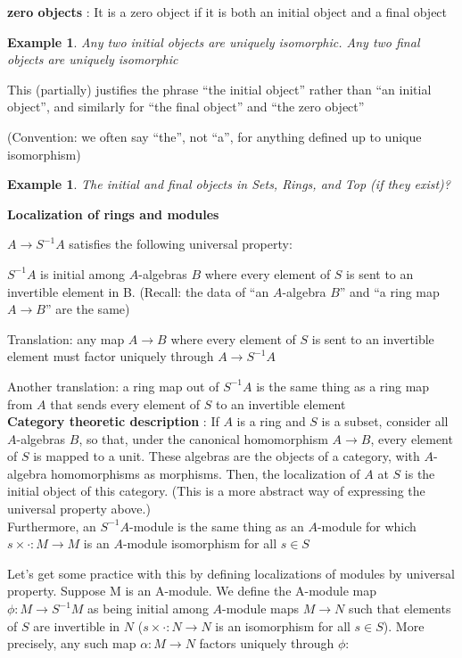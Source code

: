 \documentclass{article}
\newtheorem{example}[theorem]{Example}
\begin{document}
\textbf{zero objects} : It is a zero object if it is both an initial object and a final object
\begin{example}
    Any two initial objects are uniquely isomorphic. Any two final objects are uniquely isomorphic
\end{example}
This (partially) justifies the phrase “the initial object”
rather than “an initial object”, and similarly for “the final object” and “the zero
object”

(Convention: we often say “the”, not “a”, for anything defined up to unique isomorphism)
\begin{example}
     The initial and final objects in Sets, Rings, and Top (if they exist)?
\end{example}
\textbf{Localization of rings and modules}

$A \rightarrow S^{-1}A$ satisfies the following universal property:

$S^{-1}A$ is initial among $A$-algebras $B$ where every element of $S$ is sent to an invertible element in B. (Recall: the data of “an $A$-algebra $B$” and “a ring map $A \rightarrow B$” are the same)

Translation: any map $A \rightarrow B$ where every element of $S$ is sent to an
invertible element must factor uniquely through $A \rightarrow S^{-1}A$

Another translation:
a ring map out of $S^{-1}A$ is the same thing as a ring map from $A$ that sends every
element of $S$ to an invertible element\\

\textbf{Category theoretic description} : If $A$ is a ring and $S$ is a subset, consider all $A$-algebras $B$, so that, under the canonical homomorphism $A\rightarrow B$, every element of $S$ is mapped to a unit. These algebras are the objects of a category, with $A$-algebra homomorphisms as morphisms. Then, the localization of $A$ at $S$ is the initial object of this category. (This is a more abstract way of expressing the universal property above.)\\


Furthermore, an $S^{-1}A$-module is the same thing as an $A$-module for which $s \times \cdot: M \rightarrow M$ is an $A$-module isomorphism for all $s \in S$

 Let’s get some practice with this by defining localizations of modules by universal property. Suppose M is an A-module. We define the A-module map
$\phi: M \rightarrow S^{-1}M$ as being initial among $A$-module maps $M \rightarrow N$ such that elements of $S$ are invertible in $N$ ($s \times \cdot: N \rightarrow N$ is an isomorphism for all $s \in S$). More precisely, any such map $\alpha: M \rightarrow N$ factors uniquely through $\phi$:
\end{document}
